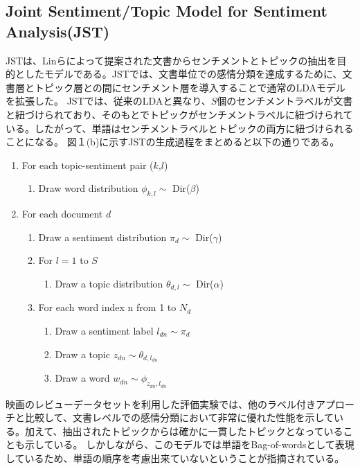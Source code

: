 \documentclass[uplatex]{jsarticle}
\begin{document}
\subsection{Joint Sentiment/Topic Model for Sentiment Analysis(JST)}
JSTは、Linら\cite{JST}によって提案された文書からセンチメントとトピックの抽出を目的としたモデルである。JSTでは、文書単位での感情分類を達成するために、文書層とトピック層との間にセンチメント層を導入することで通常のLDAモデルを拡張した。
JSTでは、従来のLDAと異なり、$S$個のセンチメントラベルが文書と紐づけられており、そのもとでトピックがセンチメントラベルに紐づけられている。したがって、単語はセンチメントラベルとトピックの両方に紐づけられることになる。
図１(b)に示すJSTの生成過程をまとめると以下の通りである。
\begin{enumerate}
    \item For each topic-sentiment pair ($k$,$l$)
          \begin{enumerate}
              \item Draw word distribution $\phi_{k,l} \sim $ Dir($\beta$)
          \end{enumerate}
    \item For each document $d$
          \begin{enumerate}
              \item Draw a sentiment distribution $\pi_{d} \sim $ Dir($\gamma$)
              \item For $l=1$ to $S$
                    \begin{enumerate}
                        \item Draw a topic distribution $ \theta_{d,l} \sim $ Dir($\alpha$)
                    \end{enumerate}
              \item For each word index n from 1 to $N_{d}$
                    \begin{enumerate}
                        \item Draw a sentiment label $l_{dn} \sim \pi_{d}$
                        \item Draw a topic $z_{dn} \sim \theta_{d, l_{dn}}$
                        \item Draw a word $w_{dn} \sim \phi_{z_{dn},l_{dn}}$
                    \end{enumerate}
          \end{enumerate}
\end{enumerate}

映画のレビューデータセットを利用した評価実験では、他のラベル付きアプローチと比較して、文書レベルでの感情分類において非常に優れた性能を示している。加えて、抽出されたトピックからは確かに一貫したトピックとなっていることも示している。
しかしながら、このモデルでは単語をBag-of-wordsとして表現しているため、単語の順序を考慮出来ていないということが指摘されている。
\end{document}
